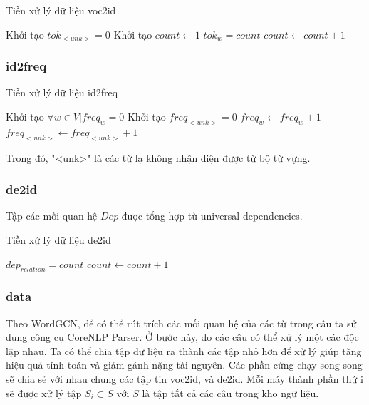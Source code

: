 {\begin{algorithm}[H]
    \caption{Tiền xử lý dữ liệu voc2id}
    \begin{algorithmic}[1]
		\State Khởi tạo $tok_{<unk>} = 0$
		\State Khởi tạo $count \gets 1$
			\State $tok_{w} = count$
			\State $count \gets count + 1$
		\EndFor
    \end{algorithmic}
\end{algorithm}

\subsubsection{id2freq}

\begin{algorithm}[H]
    \caption{Tiền xử lý dữ liệu id2freq}
    \begin{algorithmic}[1]
		\State Khởi tạo $\forall w \in V | freq_w = 0$
		\State Khởi tạo $freq_{<unk>} = 0$
				\State $freq_{w} \gets freq_{w} + 1$
			\Else 
				\State $freq_{<unk>} \gets freq_{<unk>} + 1$
			\EndIf
		\EndFor
    \end{algorithmic}
\end{algorithm}

Trong đó, "<unk>" là các từ lạ không nhận diện được từ bộ từ vựng.

\subsubsection{de2id}

Tập các mối quan hệ $Dep$ được tổng hợp từ universal dependencies. 

\begin{algorithm}[H]
    \caption{Tiền xử lý dữ liệu de2id}
    \begin{algorithmic}[1]
			\State $dep_{relation} = count$
			\State $count \gets count + 1$
		\EndFor
    \end{algorithmic}
\end{algorithm}

\subsubsection{data}

Theo WordGCN, để có thể rút trích các mối quan hệ của các từ trong câu ta sử dụng công cụ CoreNLP Parser. Ở bước này, do các câu có thể xử lý một các độc lập nhau. Ta có thể chia tập dữ liệu ra thành các tập nhỏ hơn để xử lý giúp tăng hiệu quả tính toán và giảm gánh nặng tài nguyên. Các phần cứng chạy song song sẽ chia sẻ với nhau chung các tập tin voc2id, và de2id. Mỗi máy thành phần thứ i sẽ được xử lý tập $S_i \subset S$ với $S$ là tập tất cả các câu trong kho ngữ liệu.


}
